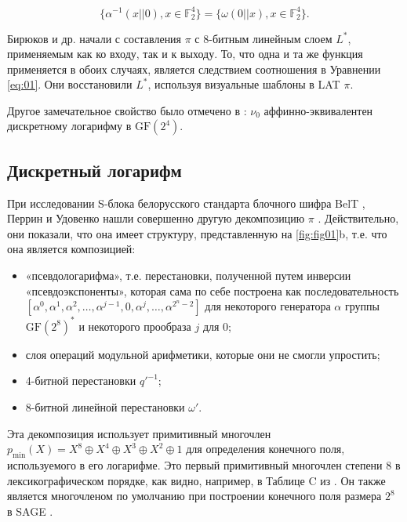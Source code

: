 \begin{equation}
\{\alpha^{-1}(x||0), x \in \mathbb{F}_2^4\} = \{\omega(0||x), x \in \mathbb{F}_2^4\}.
\label{eq:01}
\end{equation}

Бирюков и др. начали с составления \(\pi\) с 8-битным линейным слоем \(L^*\), применяемым как ко входу, так и к выходу. То, что одна и та же функция применяется в обоих случаях, является следствием соотношения в Уравнении \eqref{eq:01}. Они восстановили \(L^*\), используя визуальные шаблоны в LAT \(\pi\).

Другое замечательное свойство было отмечено в \cite{PU16}: \(\nu_0\) аффинно-эквивалентен дискретному логарифму в \(\text{GF}(2^4)\).

\subsection{Дискретный логарифм}

При исследовании S-блока белорусского стандарта блочного шифра BelT \cite{Bel11}, Перрин и Удовенко нашли совершенно другую декомпозицию \(\pi\) \cite{PU16}. Действительно, они показали, что она имеет структуру, представленную на \ref{fig:fig01}b, т.е. что она является композицией:

\begin{itemize}
    \item «псевдологарифма», т.е. перестановки, полученной путем инверсии «псевдоэкспоненты», которая сама по себе построена как последовательность \([\alpha^0, \alpha^1, \alpha^2, \ldots, \alpha^{j-1}, 0, \alpha^j, \ldots, \alpha^{2^n-2}]\) для некоторого генератора \(\alpha\) группы \(\text{GF}(2^8)^*\) и некоторого прообраза \(j\) для 0;
    \item слоя операций модульной арифметики, которые они не смогли упростить;
    \item 4-битной перестановки \(q'^{-1}\);
    \item 8-битной линейной перестановки \(\omega'\).
\end{itemize}

Эта декомпозиция использует примитивный многочлен \(p_{\text{min}}(X) = X^8 \oplus X^4 \oplus X^3 \oplus X^2 \oplus 1\) для определения конечного поля, используемого в его логарифме. Это первый примитивный многочлен степени 8 в лексикографическом порядке, как видно, например, в Таблице C из \cite{LN97}. Он также является многочленом по умолчанию при построении конечного поля размера \(2^8\) в SAGE \cite{Dev17}.

